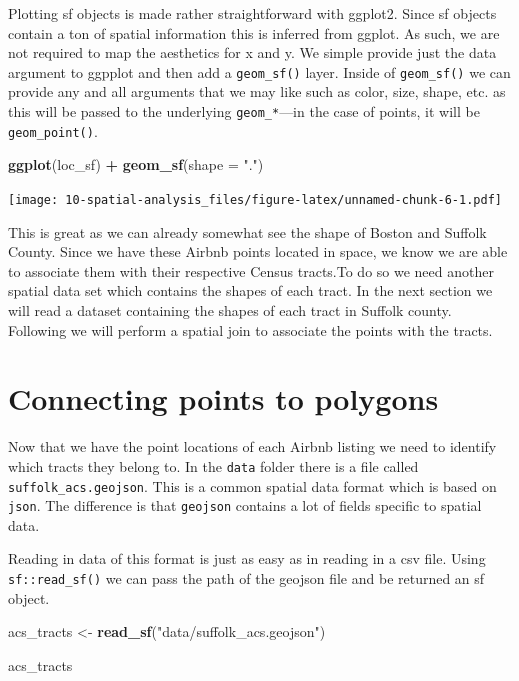 \documentclass[
]{book}
\newenvironment{Shaded}{\begin{snugshade}}{\end{snugshade}}
\newcommand{\DataTypeTok}[1]{\textcolor[rgb]{0.13,0.29,0.53}{#1}}
\newcommand{\KeywordTok}[1]{\textcolor[rgb]{0.13,0.29,0.53}{\textbf{#1}}}
\newcommand{\NormalTok}[1]{#1}
\newcommand{\OperatorTok}[1]{\textcolor[rgb]{0.81,0.36,0.00}{\textbf{#1}}}
\newcommand{\StringTok}[1]{\textcolor[rgb]{0.31,0.60,0.02}{#1}}
\begin{document}
Plotting sf objects is made rather straightforward with ggplot2. Since sf objects contain a ton of spatial information this is inferred from ggplot. As such, we are not required to map the aesthetics for x and y. We simple provide just the data argument to ggpplot and then add a \texttt{geom\_sf()} layer. Inside of \texttt{geom\_sf()} we can provide any and all arguments that we may like such as color, size, shape, etc. as this will be passed to the underlying \texttt{geom\_*}---in the case of points, it will be \texttt{geom\_point()}.

\begin{Shaded}
\begin{Highlighting}[]
\KeywordTok{ggplot}\NormalTok{(loc\_sf) }\OperatorTok{+}
\StringTok{  }\KeywordTok{geom\_sf}\NormalTok{(}\DataTypeTok{shape =} \StringTok{"."}\NormalTok{)}
\end{Highlighting}
\end{Shaded}

\texttt{[image: 10-spatial-analysis\_files/figure-latex/unnamed-chunk-6-1.pdf]}

This is great as we can already somewhat see the shape of Boston and Suffolk County. Since we have these Airbnb points located in space, we know we are able to associate them with their respective Census tracts.To do so we need another spatial data set which contains the shapes of each tract. In the next section we will read a dataset containing the shapes of each tract in Suffolk county. Following we will perform a spatial join to associate the points with the tracts.

\hypertarget{connecting-points-to-polygons}{%
\section{Connecting points to polygons}\label{connecting-points-to-polygons}}

Now that we have the point locations of each Airbnb listing we need to identify which tracts they belong to. In the \texttt{data} folder there is a file called \texttt{suffolk\_acs.geojson}. This is a common spatial data format which is based on \texttt{json}. The difference is that \texttt{geojson} contains a lot of fields specific to spatial data.

Reading in data of this format is just as easy as in reading in a csv file. Using \texttt{sf::read\_sf()} we can pass the path of the geojson file and be returned an sf object.

\begin{Shaded}
\begin{Highlighting}[]
\NormalTok{acs\_tracts \textless{}{-}}\StringTok{ }\KeywordTok{read\_sf}\NormalTok{(}\StringTok{"data/suffolk\_acs.geojson"}\NormalTok{)}

\NormalTok{acs\_tracts}
\end{Highlighting}
\end{Shaded}
\end{document}
